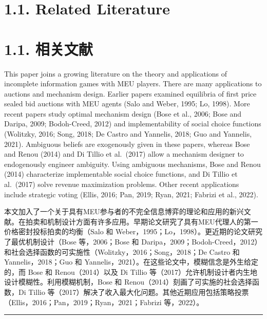 \documentclass[12pt,a4paper]{article}
\newenvironment{original}
  {\par\medskip\noindent\color{black}\ignorespaces}
  {\par\medskip}
\newenvironment{translation}
  {\par\noindent\color{darkblue}\ignorespaces}
  {\par\medskip\noindent\hrule\par\medskip}
\theoremstyle{definition}
\theoremstyle{remark}
\begin{document}
\section{1.1. Related Literature}
\section*{\color{darkblue}1.1. 相关文献}

\begin{original}
This paper joins a growing literature on the theory and applications of incomplete information games with MEU players. There are many applications to auctions and mechanism design. Earlier papers examined equilibria of first price sealed bid auctions with MEU agents (Salo and Weber, 1995; Lo, 1998). More recent papers study optimal mechanism design (Bose et al., 2006; Bose and Daripa, 2009; Bodoh-Creed, 2012) and implementability of social choice functions (Wolitzky, 2016; Song, 2018; De Castro and Yannelis, 2018; Guo and Yannelis, 2021). Ambiguous beliefs are exogenously given in these papers, whereas Bose and Renou (2014) and Di Tillio et al.\ (2017) allow a mechanism designer to endogenously engineer ambiguity. Using ambiguous mechanisms, Bose and Renou (2014) characterize implementable social choice functions, and Di Tillio et al.\ (2017) solve revenue maximization problems. Other recent applications include strategic voting (Ellis, 2016; Pan, 2019; Ryan, 2021; Fabrizi et al., 2022).
\end{original}
\begin{translation}
本文加入了一个关于具有MEU参与者的不完全信息博弈的理论和应用的新兴文献。在拍卖和机制设计方面有许多应用。早期论文研究了具有MEU代理人的第一价格密封投标拍卖的均衡（Salo 和 Weber，1995；Lo，1998）。更近期的论文研究了最优机制设计（Bose 等，2006；Bose 和 Daripa，2009；Bodoh-Creed，2012）和社会选择函数的可实施性（Wolitzky，2016；Song，2018；De Castro 和 Yannelis，2018；Guo 和 Yannelis，2021）。在这些论文中，模糊信念是外生给定的，而 Bose 和 Renou（2014）以及 Di Tillio 等（2017）允许机制设计者内生地设计模糊性。利用模糊机制，Bose 和 Renou（2014）刻画了可实施的社会选择函数，Di Tillio 等（2017）解决了收入最大化问题。其他近期应用包括策略投票（Ellis，2016；Pan，2019；Ryan，2021；Fabrizi 等，2022）。
\end{translation}
\end{document}
